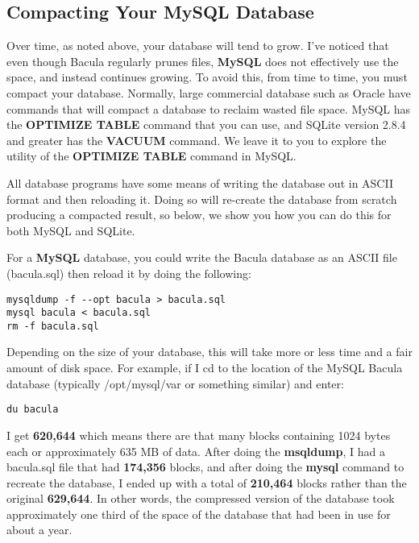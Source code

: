 \label{CompactingMySQL}

\subsection*{Compacting Your MySQL Database}

Over time, as noted above, your database will tend to grow. I've noticed that
even though Bacula regularly prunes files, {\bf MySQL} does not effectively
use the space, and instead continues growing. To avoid this, from time to
time, you must compact your database. Normally, large commercial database such
as Oracle have commands that will compact a database to reclaim wasted file
space. MySQL has the {\bf OPTIMIZE TABLE} command that you can use, and SQLite
version 2.8.4 and greater has the {\bf VACUUM} command. We leave it to you to
explore the utility of the {\bf OPTIMIZE TABLE} command in MySQL. 

All database programs have some means of writing the database out in ASCII
format and then reloading it. Doing so will re-create the database from
scratch producing a compacted result, so below, we show you how you can do
this for both MySQL and SQLite. 

For a {\bf MySQL} database, you could write the Bacula database as an ASCII
file (bacula.sql) then reload it by doing the following: 

\footnotesize
\begin{verbatim}
mysqldump -f --opt bacula > bacula.sql
mysql bacula < bacula.sql
rm -f bacula.sql
\end{verbatim}
\normalsize

Depending on the size of your database, this will take more or less time and a
fair amount of disk space. For example, if I cd to the location of the MySQL
Bacula database (typically /opt/mysql/var or something similar) and enter: 

\footnotesize
\begin{verbatim}
du bacula
\end{verbatim}
\normalsize

I get {\bf 620,644} which means there are that many blocks containing 1024
bytes each or approximately 635 MB of data. After doing the {\bf msqldump}, I
had a bacula.sql file that had {\bf 174,356} blocks, and after doing the {\bf
mysql} command to recreate the database, I ended up with a total of {\bf
210,464} blocks rather than the original {\bf 629,644}. In other words, the
compressed version of the database took approximately one third of the space
of the database that had been in use for about a year. 

